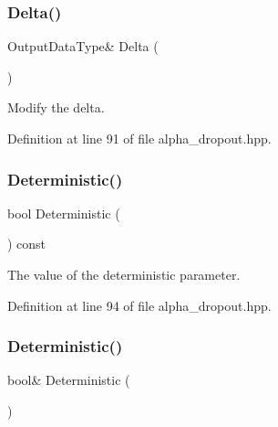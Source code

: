 \mbox{\label{classmlpack_1_1ann_1_1AlphaDropout_ad6601342d560219ce951d554e69e5e87}} 
\subsubsection{Delta()\hspace{0.1cm}{\footnotesize\ttfamily [2/2]}}
{\footnotesize\ttfamily Output\+Data\+Type\& Delta (\begin{DoxyParamCaption}{ }\end{DoxyParamCaption})\hspace{0.3cm}{\ttfamily [inline]}}



Modify the delta. 



Definition at line 91 of file alpha\+\_\+dropout.\+hpp.

\mbox{\label{classmlpack_1_1ann_1_1AlphaDropout_a9f4103707f4d199ce5594d239b60443e}} 
\subsubsection{Deterministic()\hspace{0.1cm}{\footnotesize\ttfamily [1/2]}}
{\footnotesize\ttfamily bool Deterministic (\begin{DoxyParamCaption}{ }\end{DoxyParamCaption}) const\hspace{0.3cm}{\ttfamily [inline]}}



The value of the deterministic parameter. 



Definition at line 94 of file alpha\+\_\+dropout.\+hpp.

\mbox{\label{classmlpack_1_1ann_1_1AlphaDropout_a42d4ee3da432cff20d3a41b8b1ec801c}} 
\subsubsection{Deterministic()\hspace{0.1cm}{\footnotesize\ttfamily [2/2]}}
{\footnotesize\ttfamily bool\& Deterministic (\begin{DoxyParamCaption}{ }\end{DoxyParamCaption})\hspace{0.3cm}{\ttfamily [inline]}}



